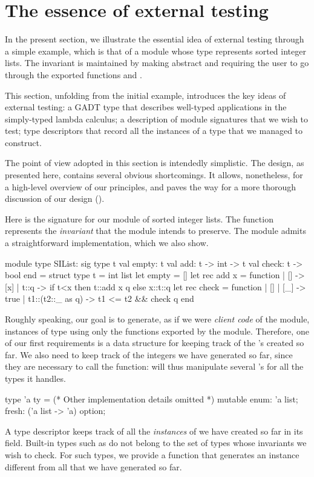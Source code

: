 \section{The essence of external testing}
\label{sec:essence}

In the present section, we illustrate the essential idea of external testing
through a simple example, which is that of a module  whose type
 represents sorted integer lists. The invariant is maintained by making
 abstract and requiring the user to go through the exported functions
 and .

This section, unfolding from the initial example, introduces the key ideas of
external testing: a GADT type that describes well-typed applications in the
simply-typed lambda calculus; a description of module signatures that we wish to
test; type descriptors that record all the instances of a type that we managed
to construct.

The point of view adopted in this section is intendedly simplistic. The design,
as presented here, contains several obvious shortcomings. It allows,
nonetheless, for a high-level overview of our principles, and paves the way for
a more thorough discussion of our design ().

Here is the signature for our module of sorted integer lists.
The  function represents the \emph{invariant} that the module
intends to preserve. The module admits a straightforward implementation, which
we also show.
%
\begin{ocamlcode}
module type SIList: sig
  type t
  val empty: t
  val add: t -> int -> t
  val check: t -> bool
end = struct
  type t = int list
  let empty = []
  let rec add x = function
    | [] -> [x]
    | t::q -> if t<x then t::add x q else x::t::q
  let rec check = function
    | [] | [_] -> true
    | t1::(t2::_ as q) -> t1 <= t2 && check q
end
\end{ocamlcode}
%
Roughly speaking, our goal is to generate, as if we were \emph{client code} of
the module, instances of type  using only the functions exported by the
module. Therefore, one of our first requirements is a data structure for keeping
track of the 's created so far. We also need to keep track of the
integers we have generated so far, since they are necessary to call the
 function: \arti will thus manipulate several 's for all the
types it handles.
%
\begin{ocamlcode}
type 'a ty = { (* Other implementation details omitted *)
  mutable enum: 'a list;
  fresh: ('a list -> 'a) option; }
\end{ocamlcode}
%
A type descriptor  keeps track of all the \emph{instances} of
 we have created so far in its  field. Built-in types such
as  do not belong to the set of types whose invariants we wish to
check. For such types, we provide a  function that generates an
instance different from all that we have generated so far.

